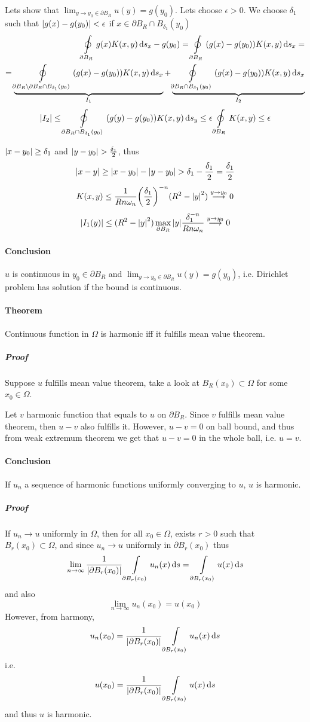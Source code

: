 Lets show that $\lim_{y\to y_0 \in \partial B_R} u(y) = g(y_0)$. Lets choose $\epsilon>0$.  We choose $\delta_1$ such that $\abs{g(x) - g(y_0)} < \epsilon$ if $x\in \partial B_R \cap B_{\delta_1}(y_0)$
\begin{align*}
\oint\limits_{\partial B_R} g(x) K (x,y) \dd{s_x} - g(y_0) = \oint\limits_{\partial B_R} \qty(g(x)- g(y_0)) K (x,y) \dd{s_x} =\\= \underbrace{\oint\limits_{\partial B_R \setminus \partial B_R \cap B_{\delta_1}(y_0)} \qty(g(x)- g(y_0)) K (x,y) \dd{s_x}}_{I_1} + \underbrace{\oint\limits_{\partial B_R \cap B_{\delta_1}(y_0)} \qty(g(x)- g(y_0)) K (x,y) \dd{s_x}}_{I_2} 
\end{align*}
$$\abs{I_2} \leq \oint\limits_{\partial B_R \cap B_{\delta_1}(y_0)} \qty(g(y)- g(y_0)) K (x,y) \dd{s_y} \leq \epsilon\oint\limits_{\partial B_R} K(x,y) \leq \epsilon $$

$\abs{x-y_0 }\geq  \delta_1$ and $\abs{y-y_0} > \frac{\delta_1}{2}$, thus
$$\abs{x-y} \geq \abs{x-y_0} - \abs{y-y_0} > \delta_1 - \frac{\delta_1}{2} = \frac{\delta_1}{2}$$
$$K(x,y) \leq \frac{1}{Rn\omega_n} \qty(\frac{\delta_1}{2})^{-n} (R^2-\abs{y}^2) \stackrel{y\to y_0}{\longrightarrow} 0$$
$$\abs{I_1(y)} \leq (R^2-\abs{y}^2) \max\limits_{\partial B_R} \abs{y} \frac{\delta_1^{-n}}{Rn\omega_n} \stackrel{y\to y_0}{\longrightarrow} 0$$
\paragraph{Conclusion}
$u$ is continuous in $y_0 \in \partial B_R$ and $\lim_{y\to y_0 \in \partial B_R} u(y) = g(y_0)$, i.e. Dirichlet problem has solution if the bound is continuous.

\paragraph{Theorem} Continuous function in $\Omega$ is harmonic iff it fulfills mean value theorem.
\subparagraph{Proof}
Suppose $u$ fulfills mean value theorem, take a look at $B_R(x_0) \subset \Omega$ for some $x_0 \in \Omega$.

Let $v$ harmonic function that equals to $u$ on $\partial B_R$. Since $v$ fulfills mean value theorem, then $u-v$ also fulfills it. However, $u-v=0$ on ball bound, and thus from weak extremum theorem we get that $u-v=0$ in the whole ball, i.e. $u=v$.
\paragraph{Conclusion} If $u_n$ a sequence of harmonic functions uniformly converging to $u$, $u$ is harmonic.
\subparagraph{Proof} If $u_n\to u$ uniformly in $\Omega$, then for all $x_0 \in \Omega$, exists $r>0$ such that $B_{r}(x_0) \subset \Omega$, and since $u_n\to u$ uniformly in $\partial B_r(x_0)$ thus
$$\lim_{n \to \infty} \frac{1}{\abs{\partial B_r(x_0)}}  \int\limits_{\partial B_r(x_0)} u_n(x) \dd{s} = \int\limits_{\partial B_r(x_0)} u(x) \dd{s}$$
and also 
$$\lim_{n \to \infty} u_n(x_0) = u(x_0)$$
However, from harmony, 
$$u_n(x_0) = \frac{1}{\abs{\partial B_r(x_0)}}  \int\limits_{\partial B_r(x_0)} u_n(x) \dd{s}$$
i.e.
$$u(x_0) = \frac{1}{\abs{\partial B_r(x_0)}}  \int\limits_{\partial B_r(x_0)} u(x) \dd{s}$$
and thus $u$ is harmonic.
